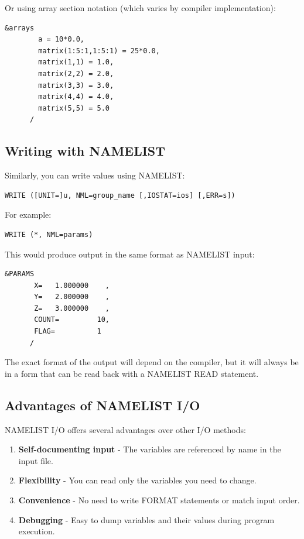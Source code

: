 Or using array section notation (which varies by compiler implementation):

\begin{lstlisting}[style=fortran77]
      &arrays 
        a = 10*0.0,
        matrix(1:5:1,1:5:1) = 25*0.0,
        matrix(1,1) = 1.0,
        matrix(2,2) = 2.0,
        matrix(3,3) = 3.0,
        matrix(4,4) = 4.0,
        matrix(5,5) = 5.0
      /
\end{lstlisting}

\subsection{Writing with NAMELIST}

Similarly, you can write values using NAMELIST:

\begin{lstlisting}[style=fortran77]
      WRITE ([UNIT=]u, NML=group_name [,IOSTAT=ios] [,ERR=s])
\end{lstlisting}

For example:

\begin{lstlisting}[style=fortran77]
      WRITE (*, NML=params)
\end{lstlisting}

This would produce output in the same format as NAMELIST input:

\begin{lstlisting}[style=fortran77]
      &PARAMS
       X=   1.000000    ,
       Y=   2.000000    ,
       Z=   3.000000    ,
       COUNT=         10,
       FLAG=          1
      /
\end{lstlisting}

The exact format of the output will depend on the compiler, but it will always be in a form that can be read back with a NAMELIST READ statement.

\subsection{Advantages of NAMELIST I/O}

NAMELIST I/O offers several advantages over other I/O methods:

\begin{enumerate}
    \item \textbf{Self-documenting input} - The variables are referenced by name in the input file.
    \item \textbf{Flexibility} - You can read only the variables you need to change.
    \item \textbf{Convenience} - No need to write FORMAT statements or match input order.
    \item \textbf{Debugging} - Easy to dump variables and their values during program execution.
\end{enumerate}

